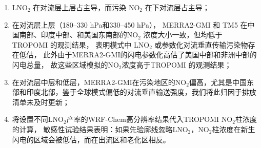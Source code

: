 \begin{enumerate}[label=（\arabic*）, labelindent=\parindent, leftmargin=0pt, widest=0, itemindent=*, topsep=0pt, partopsep=0pt, parsep=0pt]

\item LNO$_2$ 在对流层上层占主导，而污染 NO$_2$ 在下对流层占主导；

\item 在对流层上层（180--330 hPa和330--450 hPa），
MERRA2-GMI 和 TM5 在中国南部、印度中部、和美国东南部的NO$_2$ 浓度大小一致，但均低于 TROPOMI 的观测结果，
表明模式中 LNO$_2$ 或参数化对流垂直传输污染物存在低估，
此外由于MERRA2-GMI的闪电参数化高估了美国中部和非洲中部的闪电总量，
故这些区域模拟的NO$_2$浓度高于TROPOMI 的观测结果；

\item 在对流层中层和低层，MERRA2-GMI在污染地区的NO$_2$偏高，尤其是中国东部和印度北部，鉴于全球模式偏低的对流垂直输送强度，我们将此归因于排放清单未及时更新；

\item 将设置不同LNO$_2$产率的WRF-Chem高分辨率结果代入TROPOMI NO$_2$柱浓度的计算，
敏感性试验结果表明：如果先验廓线忽略LNO$_2$，NO$_2$柱浓度在新生闪电的区域会被低估，而在出流区和老化区相反。

\end{enumerate}
